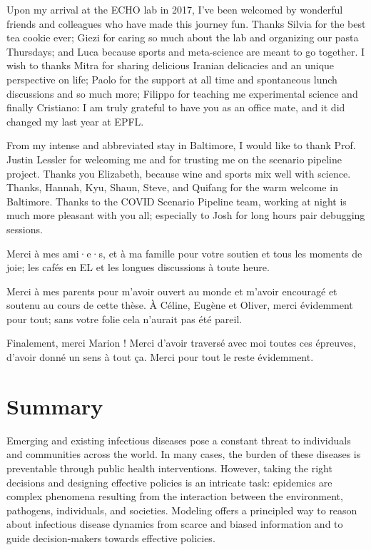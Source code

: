  Upon my arrival at the ECHO lab in 2017, I've been welcomed by wonderful friends and colleagues who have made this journey fun. Thanks Silvia for the best tea cookie ever; Giezi for caring so much about the lab and organizing our pasta Thursdays; and Luca because sports and meta-science are meant to go together. I wish to thanks Mitra for sharing delicious Iranian delicacies and an unique perspective on life; Paolo for the support at all time and spontaneous lunch discussions and so much more; Filippo for teaching me experimental science and finally Cristiano: I am truly grateful to have you as an office mate, and it did changed my last year at EPFL.
 
  From my intense and abbreviated stay in Baltimore, I would like to thank Prof. Justin Lessler for welcoming me and for trusting me on the scenario pipeline project. Thanks you Elizabeth, because wine and sports mix well with science. Thanks, Hannah, Kyu, Shaun, Steve, and Quifang for the warm welcome in Baltimore. Thanks to the COVID Scenario Pipeline team, working at night is much more pleasant with you all; especially to Josh for long hours pair debugging sessions.
 
 Merci à mes ami·e·s, et à ma famille pour votre soutien et tous les moments de joie; les cafés en EL et les longues discussions à toute heure.

Merci à mes parents pour m'avoir ouvert au monde et m'avoir encouragé et soutenu au cours de cette thèse.
À Céline, Eugène et Oliver, merci évidemment pour tout; sans votre folie cela n'aurait pas été pareil.

Finalement, merci Marion ! Merci d'avoir traversé avec moi toutes ces épreuves, d'avoir donné un sens à tout ça.%
 Merci pour tout le reste évidemment.
 
 \chapter*{Summary} %
\vspace{-.5cm}
Emerging and existing infectious diseases pose a constant threat to individuals and communities across the world. In many cases, the burden of these diseases is preventable through public health interventions. However, taking the right decisions and designing effective policies is an intricate task: epidemics are complex phenomena resulting from the interaction between the environment, pathogens, individuals, and societies. Modeling offers a principled way to reason about infectious disease dynamics from scarce and biased information and to guide decision-makers towards effective policies. 

